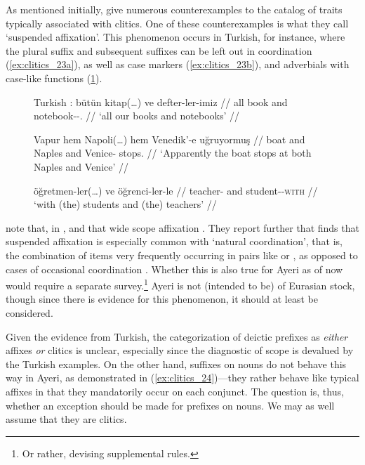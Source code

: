 As mentioned initially, \citet{spencerluis2012} give numerous counterexamples
to the catalog of traits typically associated with clitics. One of these
counterexamples is what they call `suspended affixation'. This phenomenon
occurs in Turkish, for instance, where the plural suffix  and
subsequent suffixes can be left out in coordination (\ref{ex:clitics_23a}), as
well as case markers (\ref{ex:clitics_23b}), and adverbials with case-like
functions (\ref{ex:clitics_23c}).

\begin{figure}[h]
\pex\label{ex:clitics_23}
Turkish \citep[199]{spencerluis2012}:
\a\label{ex:clitics_23a}\begingl
	\gla bütün kitap\textup{(}…\textup{)} ve defter-ler-imiz //
	\glb all book and notebook-\Pl{}-\Fpl{}.\Poss{} //
	\glft `all our books and notebooks' //
\endgl

\a\label{ex:clitics_23b}\begingl
	\gla Vapur hem Napoli\textup{(}…\textup{)} hem Venedik'-e uğruyormuş //
	\glb boat and Naples and Venice-\Loc{} stops.\Evid{} //
	\glft `Apparently the boat stops at both Naples and Venice' //
\endgl

\a\label{ex:clitics_23c}\begingl
	\gla öğretmen-ler\textup{(}…\textup{)} ve öğrenci-ler-le //
	\glb teacher-\Pl{} and student-\Pl{}-\textsc{with} //
	\glft `with (the) students and (the) teachers' //
\endgl
\xe
\end{figure}

\citet{spencerluis2012} note that, in , and that wide scope affixation . They report further that \citet{wälchli2005} finds
that suspended affixation is especially common with `natural coordination',
that is, the combination of items very frequently occurring in pairs like
 or , as opposed to cases of
occasional coordination \citep[200]{spencerluis2012}. Whether this is also true
for Ayeri as of now would require a separate survey.\footnote{Or rather,
devising supplemental rules.} Ayeri is not (intended to be) of Eurasian stock,
though since there is evidence for this phenomenon, it should at least be
considered.

Given the evidence from Turkish, the categorization of deictic prefixes as
\emph{either} affixes \emph{or} clitics is unclear, especially since the
diagnostic of scope is devalued by the Turkish examples. On the other hand,
suffixes on nouns do not behave this way in Ayeri, as demonstrated in
(\ref{ex:clitics_24})---they rather behave like typical affixes in that they
mandatorily occur on each conjunct. The question is, thus, whether an exception
should be made for prefixes on nouns. We may as well assume that they are
clitics.

